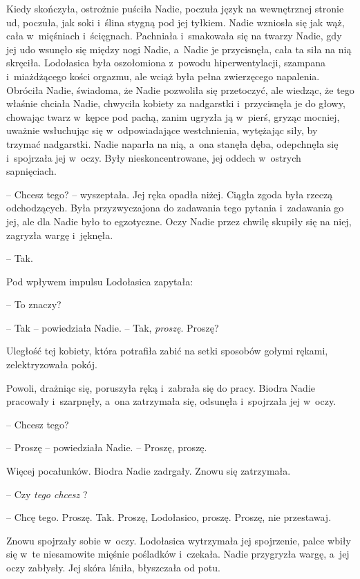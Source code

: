 \documentclass[oneside,polish,11pt,sfheadings]{mwbk}
\begin{document}
Kiedy skończyła, ostrożnie puściła Nadie, poczuła język na wewnętrznej
stronie ud, poczuła, jak soki i~ślina stygną pod jej tyłkiem. Nadie
wzniosła się jak wąż, cała w~mięśniach i~ścięgnach. Pachniała i~smakowała się na twarzy Nadie, gdy jej udo wsunęło się między nogi
Nadie, a~Nadie je przycisnęła, cała ta siła na nią skręciła. Lodołasica
była oszołomiona z~powodu hiperwentylacji, szampana i~miażdżącego kości
orgazmu, ale wciąż była pełna zwierzęcego napalenia. Obróciła Nadie,
świadoma, że Nadie pozwoliła się przetoczyć, ale wiedząc, że tego
właśnie chciała Nadie, chwyciła kobiety za nadgarstki i~przycisnęła je
do głowy, chowając twarz w~kępce pod pachą, zanim ugryzła ją w~pierś,
gryząc mocniej, uważnie wsłuchując się w~odpowiadające westchnienia,
wytężając siły, by trzymać nadgarstki. Nadie naparła na nią, a~ona
stanęła dęba, odepchnęła się i~spojrzała jej w~oczy. Były
nieskoncentrowane, jej oddech w~ostrych sapnięciach.

-- Chcesz tego? -- wyszeptała. Jej ręka opadła niżej. Ciągła zgoda była
rzeczą odchodzących. Była przyzwyczajona do zadawania tego pytania i~zadawania go jej, ale dla Nadie było to egzotyczne. Oczy Nadie przez
chwilę skupiły się na niej, zagryzła wargę i~jęknęła. 

-- Tak.

Pod wpływem impulsu Lodołasica zapytała: 

-- To znaczy?

-- Tak -- powiedziała Nadie. -- Tak, \textit{proszę}. Proszę?

Uległość tej kobiety, która potrafiła zabić na setki sposobów gołymi
rękami, zelektryzowała pokój.

Powoli, drażniąc się, poruszyła ręką i~zabrała się do pracy. Biodra
Nadie pracowały i~szarpnęły, a~ona zatrzymała się, odsunęła i~spojrzała
jej w~oczy. 

-- Chcesz tego?

-- Proszę -- powiedziała Nadie. -- Proszę, proszę.

Więcej pocałunków. Biodra Nadie zadrgały. Znowu się zatrzymała.

-- Czy \textit{tego chcesz }?

-- Chcę tego. Proszę. Tak. Proszę, Lodołasico, proszę. Proszę, nie
przestawaj.

Znowu spojrzały sobie w~oczy. Lodołasica wytrzymała jej spojrzenie,
palce wbiły się w~te niesamowite mięśnie pośladków i~czekała. Nadie
przygryzła wargę, a~jej oczy zabłysły. Jej skóra lśniła, błyszczała od
potu.
\end{document}
